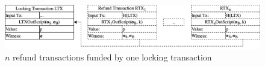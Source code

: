\documentclass{cacthesis}
\begin{document}
        
        
        \begin{figure}
            \begin{center}
                \includegraphics[width=\textwidth]{images/locking_refund_tx_figure.png}
              \caption{$n$ refund transactions funded by one locking transaction}
              \label{fig:lockingRefundTx}
            \end{center}
            \end{figure}
            
        
\end{document}
